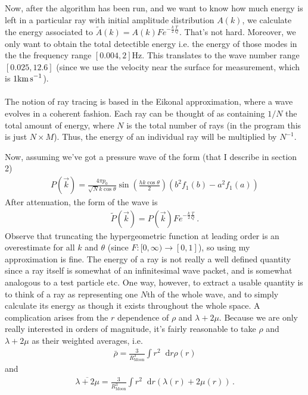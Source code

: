 \documentclass{article}
\newcommand*\diff{\mathop{}\!\mathrm{d}}
\newcommand*\te[1]{\text{#1}}
\newcommand*\p[1]{\left(#1\right)}
\newcommand*\f[2]{\frac{#1}{#2}}
\begin{document}
Now, after the algorithm has been run, and we want to know how much energy is left in a particular ray with initial amplitude distribution $A(k)$, we calculate the energy associated to $\tilde A(k) = A(k)Fe^{-\f{k}{2}\f{T}{Q}}$. That's not hard. Moreover, we only want to obtain the total detectible energy i.e. the energy of those modes in the the frequency range $[0.004,2]\te{Hz}$. This translates to the wave number range $[0.025,12.6]$ (since we use the velocity near the surface for measurement, which is $1\te{km\,s}^{-1}$).
\\\\
The notion of ray tracing is based in the Eikonal approximation, where a wave evolves in a coherent fashion. Each ray can be thought of as containing $1/N$ the total amount of energy, where $N$ is the total number of rays (in the program this is just $N\times M$). Thus, the energy of an individual ray will be multiplied by $N^{-1}$.


Now, assuming we've got a pressure wave of the form (that I describe in section 2)
\begin{align}
P(\vec k)=\f{4\pi p_0}{\sqrt{N}k\cos\theta}\sin\p{\f{h k\cos\theta}{2}}(b^2f_1(b)-a^2f_1(a))
\end{align}
After attenuation, the form of the wave is
\begin{align}
\tilde P(\vec k) = P(\vec k)Fe^{-\f{k}{2}\f{T}{Q}}\,.
\end{align}
Observe that truncating the hypergeometric function at leading order is an overestimate for all $k$ and $\theta$ (since $F:[0,\infty)\to[0,1]$), so using my approximation is fine. The energy of a ray is not really a well defined quantity since a ray itself is somewhat of an infinitesimal wave packet, and is somewhat analogous to a test particle etc. One way, however, to extract a usable quantity is to think of a ray as representing one $N$th of the whole wave, and to simply calculate its energy as though it exists throughout the whole space. A complication arises from the $r$ dependence of $\rho$ and $\lambda + 2\mu$. Because we are only really interested in orders of magnitude, it's fairly reasonable to take $\rho$ and $\lambda + 2\mu$ as their weighted averages, i.e.
\begin{align}
\bar\rho = \f{3}{R_{\te{Moon}}^3}\int r^2\diff r\rho(r)
\end{align}
and
\begin{align}
\overline{\lambda + 2\mu} =  \f{3}{R_{\te{Moon}}^3}\int r^2\diff r\p{\lambda(r) + 2\mu(r)}\,.
\end{align}
\pagebreak
\end{document}
